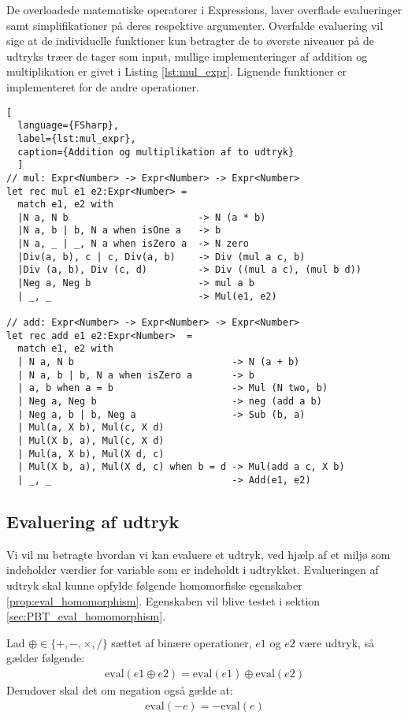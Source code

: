 De overloadede matematiske operatorer i Expressions, laver overflade evalueringer samt simplifikationer på deres respektive argumenter. Overfalde evaluering vil sige at de individuelle funktioner kun betragter de to øverste niveauer på de udtryks træer de tager som input, mullige implementeringer af addition og multiplikation er givet i Listing \ref{lst:mul_expr}. Lignende funktioner er implementeret for de andre operationer.

\begin{lstlisting}[
  language={FSharp}, 
  label={lst:mul_expr}, 
  caption={Addition og multiplikation af to udtryk}
  ]
// mul: Expr<Number> -> Expr<Number> -> Expr<Number>
let rec mul e1 e2:Expr<Number> =
  match e1, e2 with
  |N a, N b                       -> N (a * b)
  |N a, b | b, N a when isOne a   -> b
  |N a, _ | _, N a when isZero a  -> N zero
  |Div(a, b), c | c, Div(a, b)    -> Div (mul a c, b)
  |Div (a, b), Div (c, d)         -> Div ((mul a c), (mul b d))
  |Neg a, Neg b                   -> mul a b
  | _, _                          -> Mul(e1, e2)

// add: Expr<Number> -> Expr<Number> -> Expr<Number>
let rec add e1 e2:Expr<Number>  =
  match e1, e2 with
  | N a, N b                            -> N (a + b)
  | N a, b | b, N a when isZero a       -> b
  | a, b when a = b                     -> Mul (N two, b)
  | Neg a, Neg b                        -> neg (add a b) 
  | Neg a, b | b, Neg a                 -> Sub (b, a)
  | Mul(a, X b), Mul(c, X d) 
  | Mul(X b, a), Mul(c, X d)
  | Mul(a, X b), Mul(X d, c) 
  | Mul(X b, a), Mul(X d, c) when b = d -> Mul(add a c, X b)
  | _, _                                -> Add(e1, e2)

\end{lstlisting}

\subsection{Evaluering af udtryk}\label{sec:eval}
Vi vil nu betragte hvordan vi kan evaluere et udtryk, ved hjælp af et miljø som indeholder værdier for variable som er indeholdt i udtrykket. Evalueringen af udtryk skal kunne opfylde følgende homomorfiske egenskaber \ref{prop:eval_homomorphism}. Egenskaben vil blive testet i sektion \ref{sec:PBT_eval_homomorphism}.
\vspace{0.5cm}
\begin{egenskab}\label{prop:eval_homomorphism}
Lad $\oplus \in \{+, -, \times, /\}$ sættet af binære operationer, $e1$ og $e2$ være udtryk, så gælder følgende:
\begin{align*}
    \text{eval}(e1 \oplus e2) = \text{eval}(e1) \oplus \text{eval}(e2)
\end{align*}
Derudover skal det om negation også gælde at:
\begin{align*}
    \text{eval}(-e) = -\text{eval}(e)
\end{align*}
\end{egenskab}


